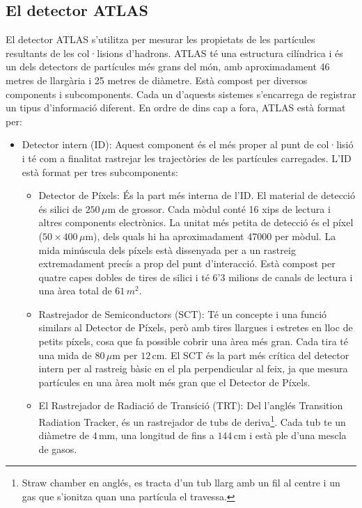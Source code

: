 \subsection{El detector ATLAS}
\label{chap:resumen_val:Exp:ATLAS}
El detector ATLAS s'utilitza per mesurar les propietats de les partícules resultants de les col·lisions d'hadrons. 
ATLAS té una estructura cilíndrica i és un dels detectors de partícules més grans del món, amb aproximadament 
46 metres de llargària i 25 metres de diàmetre. Està compost per diversos components i subcomponents. 
Cada un d'aquests sistemes s'encarrega de registrar un tipus d'informació diferent. En ordre de dins cap a fora, 
ATLAS està format per:
\begin{itemize}
\item Detector intern (ID): Aquest component és el més proper al punt de col·lisió i té com a finalitat 
	rastrejar les trajectòries de les partícules carregades. L'ID està format per tres subcomponents:
	\begin{itemize}
	\item Detector de Píxels: És la part més interna de l'ID. El material de detecció és silici de $250\,\mu$m 
		de grossor. Cada mòdul conté 16 xips de lectura i altres components electrònics. La unitat més petita 
		de detecció és el píxel ($50\times400 \,\mu$m), dels quals hi ha aproximadament 47000 per mòdul.
		La mida minúscula dels píxels està dissenyada per a un rastreig extremadament precís a prop del 
		punt d'interacció. Està compost per quatre capes dobles de tires de silici i té 6'3 milions de canals de 
		lectura i una àrea total de $61\,m^{2}$.
		
	\item Rastrejador de Semiconductors (SCT):  Té un concepte i una funció similars al Detector de Píxels, 
		però amb tires llargues i estretes en lloc de petits píxels, cosa que fa possible cobrir una àrea més gran.
		Cada tira té una mida de $80\,\mu$m per $12\,$cm. El SCT és la part més crítica del detector intern per al 
		rastreig bàsic en el pla perpendicular al feix, ja que mesura partícules en una àrea molt més gran que el 
		Detector de Píxels.
		
	\item El Rastrejador de Radiació de Transició (TRT): Del l'anglés Transition Radiation Tracker, és un 
		rastrejador de tubs de deriva\footnote{Straw chamber en anglés, es tracta d'un tub llarg amb un fil al centre i un
		gas que s'ionitza quan una partícula el travessa.}. Cada tub te un diàmetre 
		de $4\,$mm, una longitud de fins a $144\,$cm i està ple d'una mescla de gasos.
\end{itemize}


\end{itemize}
